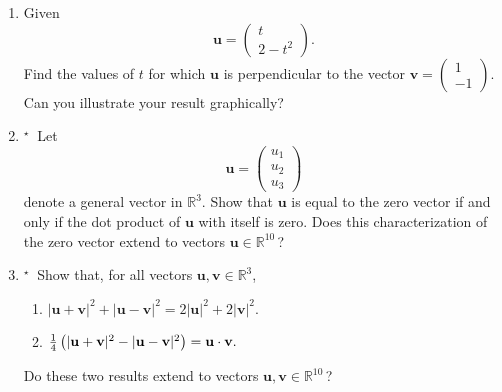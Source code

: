 \documentclass[11pt,a4paper]{article}
\def\tough{$\!\!\!{}^\star\>$}
\newcommand{\R}{{\mathbb{R}}}
\begin{document}
\begin{enumerate}
\item\label{qdjs3v}
Given
  $$\mathbf{u}= \left ( \begin{array}{c} t\\ 2-t^2 \end{array} \right ). $$
 Find the values of $t$  for which   $\mathbf{u}$ is perpendicular to the vector
  $\mathbf{v}= \left ( \begin{array}{r} 1\\ -1 \end{array} \right ). $\\
Can you illustrate your result graphically? 

%


\item\label{qdjs4v}\tough
Let 
  $$\mathbf{u}= \left ( \begin{array}{c} u_1\\ u_2\\ u_3 \end{array} \right )$$
 denote  a general vector in $\R^3$.
 Show that $\mathbf{u}$ is equal to the zero vector if and only if the 
 dot product of  $\mathbf{u}$ with itself is zero. Does this 
 characterization  of the zero vector extend to  vectors $\mathbf{u} \in \R^{10}\,$? 
%


\item\label{qdjs5v}\tough
Show that, for all vectors $\mathbf{u},  \mathbf{v} \in \R^3$, 
 \begin{enumerate}
\item $| \mathbf{u} +   \mathbf{v}|^2 + | \mathbf{u} -   \mathbf{v}|^2 =
2 | \mathbf{u}|^2 + 2 | \mathbf{v}|^2 .$
\item $ {1\over 4} \left( | \mathbf{u} +   \mathbf{v}|^2 -  | \mathbf{u} -   \mathbf{v}|^2 \right)=
\mathbf{u}\cdot \mathbf{v}.$
 \end{enumerate}
Do these two results extend to  vectors $\mathbf{u},  \mathbf{v} \in \R^{10}\,$? 

%
\end{enumerate}

\vfill\eject
\end{document}
